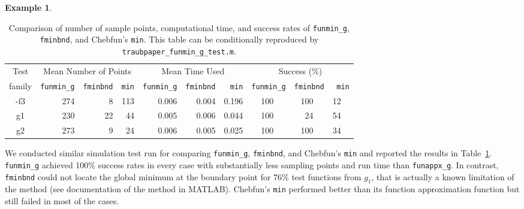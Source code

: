 \documentclass[review]{elsarticle}
\theoremstyle{definition}
\newtheorem{exmp}{Example}
\newcommand{\funappxg}{\texttt{funappx\_g}\xspace}
\newcommand{\funming}{\texttt{funmin\_g\xspace}}
\newcommand{\fminbnd}{\texttt{fminbnd\xspace}}
\begin{document}
\begin{exmp}
%
\begin{table}[tbh]
	\centering
	\caption{Comparison of number of sample points, computational time,  and success
		rates of \funming, \fminbnd, and
		Chebfun's \texttt{min}. 
		This table can be conditionally reproduced by
		\texttt{traubpaper\_funmin\_g\_test.m}.}
	\label{tab:funmingVsfminbndVsChebfun}
	{\footnotesize
		\setlength{\tabcolsep}{.38em} %
		\begin{tabular}{|c|rrr|rrr|rrrrrr|}
			\hline
			Test      &     \multicolumn{3}{c|}{Mean Number of Points} & \multicolumn{3}{c|}{Mean Time Used}  & \multicolumn{6}{|c|}{Success (\%)}  
			\\  family &  \funming  &  \fminbnd    &  \texttt{min}    & \funming     &  \fminbnd  & \texttt{min}   & \multicolumn{2}{r}{\funming} & \multicolumn{2}{r}{\fminbnd} & \multicolumn{2}{r|}{\texttt{min}}   
			\\ \hline
			-f3   &  274   &   8   &   113    &   0.006   &    0.004    &  0.196  &    100   &  &  100   &   &  12 &
			\\ \phantom{-}g1   &  230   &  22   &    44    &   0.005   &    0.006    &  0.044  &    100   &  &   24   &   &  54 &      
			\\ \phantom{-}g2   &  273   &   9   &    24    &   0.006   &    0.005    &  0.025  &    100   &  &  100   &   &  34 &  
			\\ \hline
		\end{tabular}
	}
\end{table}
%

We conducted similar simulation test run for comparing \funming, \fminbnd, and
Chebfun's \texttt{min} and reported the results in
Table~\ref{tab:funmingVsfminbndVsChebfun}. \funming{} achieved 100\%
success rates in every case with substantially less sampling points and run time than \funappxg. 
In contrast, \fminbnd{} could not locate the global
minimum at the boundary point for 76\% test functions from $g_1$, that is actually a known
limitation of the method (see documentation of the method in MATLAB). Chebfun's  
{\tt min} performed better than its function approximation function but still failed in most of the cases.



\end{exmp}
\end{document}
